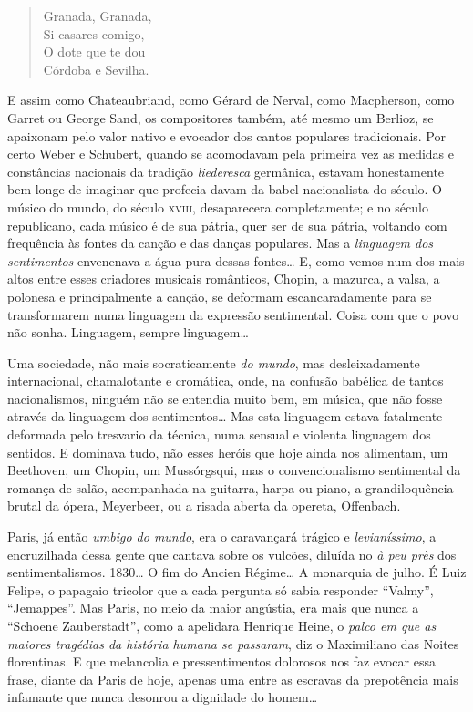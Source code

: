 \begin{verse}
\small{
Granada, Granada,\\
Si casares comigo,\\
O dote que te dou\\
Córdoba e Sevilha.}
\end{verse}

E assim como Chateaubriand, como Gérard de Nerval, como Macpherson, como
Garret ou George Sand, os compositores também, até mesmo um Berlioz, se
apaixonam pelo valor nativo e evocador dos cantos populares
tradicionais. Por certo Weber e Schubert, quando se acomodavam pela
primeira vez as medidas e constâncias nacionais da tradição
\textit{liederesca} germânica, estavam honestamente bem longe de imaginar que
profecia davam da babel nacionalista do século. O músico do mundo, do
século \textsc{xviii}, desaparecera completamente; e no século republicano, cada
músico é de sua pátria, quer ser de sua pátria, voltando com frequência
às fontes da canção e das danças populares. Mas a \textit{linguagem dos
sentimentos} envenenava a água pura dessas fontes\ldots{} E, como vemos num
dos mais altos entre esses criadores musicais românticos, Chopin, a
mazurca, a valsa, a polonesa e principalmente a canção, se deformam
escancaradamente para se transformarem numa linguagem da expressão
sentimental. Coisa com que o povo não sonha. Linguagem, sempre
linguagem\ldots{}

Uma sociedade, não mais socraticamente \textit{do mundo}, mas desleixadamente
internacional, chamalotante e cromática, onde, na confusão babélica de
tantos nacionalismos, ninguém não se entendia muito bem, em música, que
não fosse através da linguagem dos sentimentos\ldots{} Mas esta linguagem
estava fatalmente deformada pelo tresvario da técnica, numa sensual e
violenta linguagem dos sentidos. E dominava tudo, não esses heróis que
hoje ainda nos alimentam, um Beethoven, um Chopin, um Mussórgsqui, mas o
convencionalismo sentimental da romança de salão, acompanhada na
guitarra, harpa ou piano, a grandiloquência brutal da ópera, Meyerbeer,
ou a risada aberta da opereta, Offenbach.

Paris, já então \textit{umbigo do mundo}, era o caravançará trágico e
\textit{levianíssimo}, a encruzilhada dessa gente que cantava sobre os vulcões,
diluída no \textit{à peu près} dos sentimentalismos. 1830\ldots{} O fim do Ancien
Régime\ldots{} A monarquia de julho. É Luiz Felipe, o papagaio tricolor que a
cada pergunta só sabia responder ``Valmy'', ``Jemappes''. Mas Paris, no
meio da maior angústia, era mais que nunca a ``Schoene Zauberstadt'',
como a apelidara Henrique Heine, o \textit{palco em que as maiores tragédias
da história humana se passaram}, diz o Maximiliano das Noites
florentinas. E que melancolia e pressentimentos dolorosos nos faz evocar
essa frase, diante da Paris de hoje, apenas uma entre as escravas da
prepotência mais infamante que nunca desonrou a dignidade do homem\ldots{}

